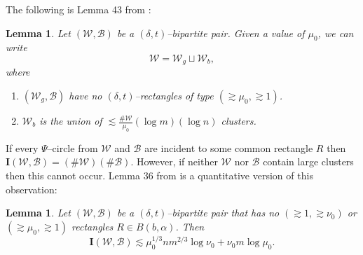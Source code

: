 \documentclass[reqno]{amsart}
\newtheorem{lem}[thm]{Lemma}
\theoremstyle{definition}
\theoremstyle{remark}
\theoremstyle{remark}
\newcommand{\incidences}{\mathbf I}
\newcommand{\dt}{(\delta,t)}
\newcommand{\WC}{\mathcal W}
\newcommand{\BC}{\mathcal B}
\newcommand{\WB}{(\mathcal W,\mathcal B)}
\begin{document}
The following is Lemma 43 from \cite{Zahl}:
\begin{lem}\label{lemma115}
Let $\WB$ be a $\dt$--bipartite pair. Given a value of $\mu_0$, we can write
\begin{equation}
\WC=\WC_g\sqcup\WC_b,
\end{equation}
where
\begin{enumerate}[label=(\roman{*}), ref=(\roman{*})]
\item\label{lemma115Prop1} $(\WC_g,\BC)$ have no
$\dt$--rectangles of type
$(\gtrsim\mu_0,\gtrsim1)$.%
\item\label{lemma115Prop2} $\WC_b$ is the union of
$\lesssim\frac{\#\WC}{\mu_0}(\log m)(\log n)$ clusters.
\end{enumerate}
\end{lem}

If every $\Psi$--circle from $\WC$ and $\BC$ are incident to some common rectangle $R$ then $\incidences(\WC,\BC)=(\#\WC)(\#\BC)$. However, if neither $\WC$ nor $\BC$ contain large clusters then this cannot occur.  Lemma 36 from \cite{Zahl} is a quantitative version of this observation:
\begin{lem}\label{lemma111}
Let $\WB$ be a $\dt$--bipartite pair that has no
$(\gtrsim1, \gtrsim\nu_0)$ or $(\gtrsim\mu_0,\gtrsim1)$ rectangles
$R\in B(b,\alpha)$. Then
\begin{equation}
\incidences(\mathcal W,\mathcal
B)\lesssim\mu_0^{1/3}nm^{2/3}\log \nu_0+\nu_0m\log\mu_0.
\end{equation}
\end{lem}
\end{document}
